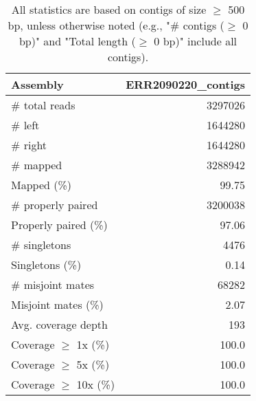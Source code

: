 \documentclass[12pt,a4paper]{article}
\begin{document}
\begin{table}[ht]
\begin{center}
\caption{All statistics are based on contigs of size $\geq$ 500 bp, unless otherwise noted (e.g., "\# contigs ($\geq$ 0 bp)" and "Total length ($\geq$ 0 bp)" include all contigs).}
\begin{tabular}{|l*{1}{|r}|}
\hline
Assembly & ERR2090220\_contigs \\ \hline
\# total reads & 3297026 \\ \hline
\# left & 1644280 \\ \hline
\# right & 1644280 \\ \hline
\# mapped & 3288942 \\ \hline
Mapped (\%) & 99.75 \\ \hline
\# properly paired & 3200038 \\ \hline
Properly paired (\%) & 97.06 \\ \hline
\# singletons & 4476 \\ \hline
Singletons (\%) & 0.14 \\ \hline
\# misjoint mates & 68282 \\ \hline
Misjoint mates (\%) & 2.07 \\ \hline
Avg. coverage depth & 193 \\ \hline
Coverage $\geq$ 1x (\%) & 100.0 \\ \hline
Coverage $\geq$ 5x (\%) & 100.0 \\ \hline
Coverage $\geq$ 10x (\%) & 100.0 \\ \hline
\end{tabular}
\end{center}
\end{table}
\end{document}
